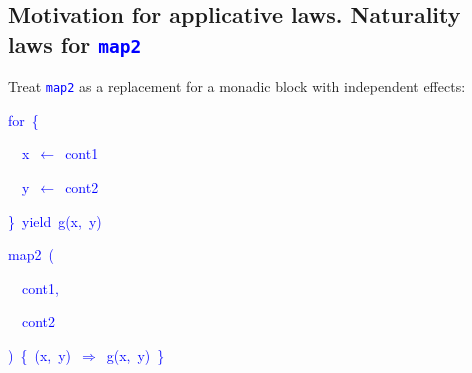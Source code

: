 \subsection{Motivation for applicative laws. Naturality laws for \texttt{\textcolor{blue}{\footnotesize{}map2}} }

Treat \texttt{\textcolor{blue}{\footnotesize{}map2}} as a replacement
for a monadic block with independent effects:\texttt{\textcolor{blue}{\footnotesize{}\smallskip{}
}}{\footnotesize\par}

\texttt{\textcolor{blue}{\footnotesize{}}}%
\begin{minipage}[c][1\totalheight][t]{0.49\columnwidth}%
\begin{lyxcode}
\textcolor{blue}{\footnotesize{}for~\{}{\footnotesize\par}

\textcolor{blue}{\footnotesize{}~~x~$\leftarrow$~cont1}{\footnotesize\par}

\textcolor{blue}{\footnotesize{}~~y~$\leftarrow$~cont2}{\footnotesize\par}

\textcolor{blue}{\footnotesize{}\}~yield~g(x,~y)}{\footnotesize\par}
\end{lyxcode}
%
\end{minipage}\texttt{\textcolor{blue}{\footnotesize{}\hfill{}}}%
\begin{minipage}[c][1\totalheight][t]{0.49\columnwidth}%
\begin{lyxcode}
\textcolor{blue}{\footnotesize{}map2~(}{\footnotesize\par}

\textcolor{blue}{\footnotesize{}~~cont1,}{\footnotesize\par}

\textcolor{blue}{\footnotesize{}~~cont2}{\footnotesize\par}

\textcolor{blue}{\footnotesize{})~\{~(x,~y)~$\Rightarrow$~g(x,~y)~\}}{\footnotesize\par}
\end{lyxcode}
%
\end{minipage}\texttt{\textcolor{blue}{\footnotesize{}\hfill{}\medskip{}
}}{\footnotesize\par}
